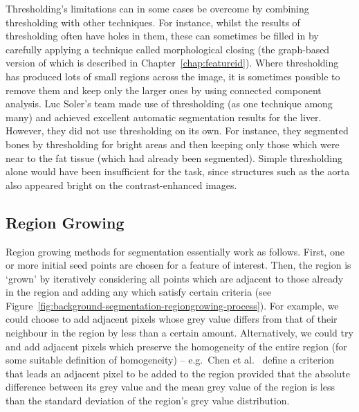 \noindent Thresholding's limitations can in some cases be overcome by combining thresholding with other techniques. For instance, whilst the results of thresholding often have holes in them, these can sometimes be filled in by carefully applying a technique called morphological closing (the graph-based version of which is described in Chapter~\ref{chap:featureid}). Where thresholding has produced lots of small regions across the image, it is sometimes possible to remove them and keep only the larger ones by using connected component analysis. Luc Soler's team \cite{soler01} made use of thresholding (as one technique among many) and achieved excellent automatic segmentation results for the liver. However, they did not use thresholding on its own. For instance, they segmented bones by thresholding for bright areas and then keeping only those which were near to the fat tissue (which had already been segmented). Simple thresholding alone would have been insufficient for the task, since structures such as the aorta also appeared bright on the contrast-enhanced images.

\subsection{Region Growing}
\label{subsec:background-segmentation-regiongrowing}

Region growing methods for segmentation essentially work as follows. First, one or more initial seed points are chosen for a feature of interest. Then, the region is `grown' by iteratively considering all points which are adjacent to those already in the region and adding any which satisfy certain criteria (see Figure~\ref{fig:background-segmentation-regiongrowing-process}). For example, we could choose to add adjacent pixels whose grey value differs from that of their neighbour in the region by less than a certain amount. Alternatively, we could try and add adjacent pixels which preserve the homogeneity of the entire region (for some suitable definition of homogeneity) -- e.g.~Chen et al.\ \cite{chen09} define a criterion that leads an adjacent pixel to be added to the region provided that the absolute difference between its grey value and the mean grey value of the region is less than the standard deviation of the region's grey value distribution.

